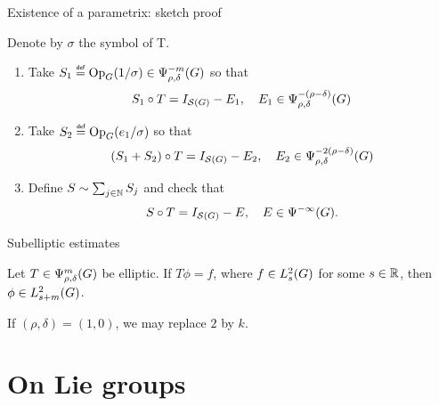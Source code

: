 \documentclass[handout]{beamer}
\begin{document}
\begin{frame}
    {Existence of a parametrix: sketch proof}

    \pause
    Denote by $\sigma$ the symbol of T.
    \begin{enumerate}
        \item Take $S_1 \defeq \Op(1 / \sigma) \in \OperatorClass {-m} {\rho, \delta}$ so that
            \begin{align*}
                S_1 \circ T = \Id {\Schwartz \Group} - E_1,
                \quad E_1 \in \OperatorClass {-(\rho - \delta)} {\rho, \delta}
            \end{align*}
            \pause
        \item Take $S_2 \defeq \Op(e_1/\sigma)$ so that
            \begin{align*}
                (S_1 + S_2) \circ T = \Id {\Schwartz \Group} - E_2,
                \quad E_2 \in \OperatorClass {-2(\rho - \delta)} {\rho, \delta}
            \end{align*}
            \pause
        \item Define $S \sim \sum_{j \in \mathbb{N}} S_j$ and check that
            \begin{align*}
                S \circ T = \Id {\Schwartz \Group} - E,
                \quad E \in \SmoothingOperators.
            \end{align*}
    \end{enumerate}
\end{frame}

\begin{frame}
    {Subelliptic estimates}

    \begin{theorem}
        Let $T \in \OperatorClass m {\rho, \delta}$ be elliptic.
        If $T \phi = f$,
        where $f \in \Sobolev s$ for some $s \in \mathbb{R}$,
        then $\phi \in \Sobolev {s + m}$.

        If $(\rho, \delta) = (1, 0)$,
        we may replace $2$ by $k$.
    \end{theorem}
\end{frame}

\section{On Lie groups}

\renewcommand{\Group}{G}
\end{document}
